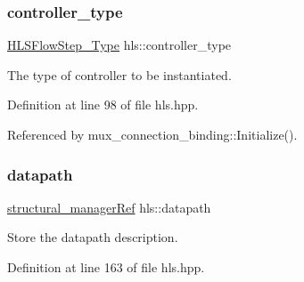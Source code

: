 \mbox{\label{classhls_a901e0a985cea95b069602fbdf0cdcc94}} 
\subsubsection{\texorpdfstring{controller\+\_\+type}{controller\_type}}
{\footnotesize\ttfamily \hyperlink{hls__step_8hpp_ada16bc22905016180e26fc7e39537f8d}{H\+L\+S\+Flow\+Step\+\_\+\+Type} hls\+::controller\+\_\+type}



The type of controller to be instantiated. 



Definition at line 98 of file hls.\+hpp.



Referenced by mux\+\_\+connection\+\_\+binding\+::\+Initialize().

\mbox{\label{classhls_aa93c9c2ca7dbf225231a593300dd459a}} 
\subsubsection{\texorpdfstring{datapath}{datapath}}
{\footnotesize\ttfamily \hyperlink{structural__manager_8hpp_ab3136f0e785d8535f8d252a7b53db5b5}{structural\+\_\+manager\+Ref} hls\+::datapath}



Store the datapath description. 



Definition at line 163 of file hls.\+hpp.



